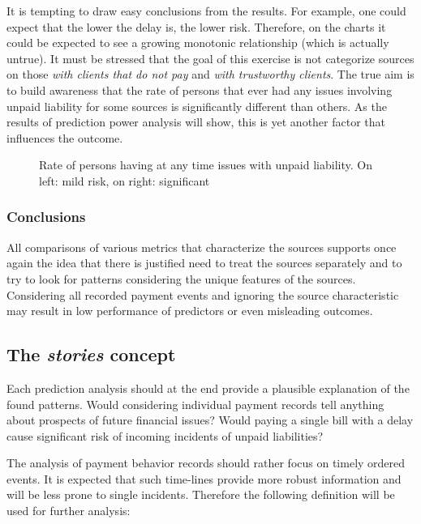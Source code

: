 \documentclass{article}
\begin{document}
\par
It is tempting to draw easy conclusions from the results.
For example, one could expect that the lower the delay is, the lower risk.
Therefore, on the charts it could be expected to see a growing monotonic relationship (which is actually untrue).
It must be stressed that the goal of this exercise is not categorize sources on those \textit{with clients that do not pay} and \textit{with trustworthy clients}.
The true aim is to build awareness that the rate of persons that ever had any issues involving unpaid liability for some sources is significantly different than others.
As the results of prediction power analysis will show, this is yet another factor that influences the outcome.

\begin{figure}[htbp!]
    \begin{center}
        
    \caption{Rate of persons having at any time issues with unpaid liability. On left: mild risk, on right: significant}
    \label{fig:102_risk_rate}
    \end{center}
\end{figure}

\subsubsection{Conclusions}

All comparisons of various metrics that characterize the sources supports once again the idea that there is justified
need to treat the sources separately and to try to look for patterns considering the unique features of the sources.
Considering all recorded payment events and ignoring the source characteristic may result in low performance of
predictors or even misleading outcomes.

\subsection{The \textit{stories} concept}
\label{section:exploratory-stories}

Each prediction analysis should at the end provide a plausible explanation of the found patterns.
Would considering individual payment records tell anything about prospects of future financial issues?
Would paying a single bill with a delay cause significant risk of incoming incidents of unpaid liabilities?
\par
The analysis of payment behavior records should rather focus on timely ordered events.
It is expected that such time-lines provide more robust information and will be less prone to single incidents.
Therefore the following definition will be used for further analysis:
\end{document}
